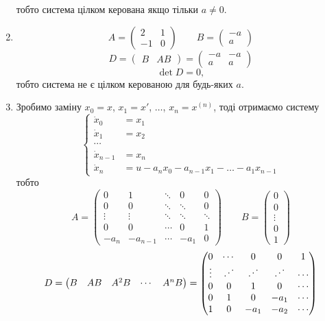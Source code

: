 \begin{solution}
\begin{enumerate}
        тобто система цілком керована якщо тільки $a \ne 0$.
        \item \[ A = \begin{pmatrix} 2 & 1 \\ -1 & 0 \end{pmatrix} \qquad B = \begin{pmatrix} -a \\ a \end{pmatrix} \]
        \[ D = \begin{pmatrix} B & AB \end{pmatrix} = \begin{pmatrix} -a & -a \\ a & a \end{pmatrix} \]
        \[ \det D = 0, \]
        тобто система не є цілком керованою для будь-яких $a$.
        \item Зробимо заміну $x_0 = x$, $x_1 = x'$, $\ldots$, $x_n = x^{(n)}$, тоді отримаємо систему
        \[ \left\{ \begin{aligned} \dot x_0 &= x_1 \\ \dot x_1 &= x_2 \\ \cdots \\ \dot x_{n-1} &= x_n \\ \dot x_n &= u - a_n x_0 - a_{n-1} x_1 - \ldots - a_1 x_{n-1} \end{aligned} \right. \]
        тобто
        \[ A = \begin{pmatrix} 0 & 1 & \ddots & 0 & 0 \\ 0 & 0 & \ddots & \ddots & 0 \\ \vdots & \vdots & \ddots & \ddots & \ddots \\ 0 & 0 & \cdots & 0 & 1 \\ -a_n & -a_{n-1} & \cdots & -a_1 & 0 \end{pmatrix} \qquad B = \begin{pmatrix} 0 \\ 0 \\ \vdots \\ 0 \\ 1 \end{pmatrix} \]
        \[ D = \begin{pmatrix} B & AB & A^2B & \cdots & A^nB \end{pmatrix} = \begin{pmatrix} 0 & \cdots & 0 & 0 & 1 \\ \vdots & \reflectbox{$\ddots$} & \reflectbox{$\ddots$} & \reflectbox{$\ddots$} & \cdots \\ 0 & 0 & 1 & 0 & \cdots \\ 0 & 1 & 0 & -a_1 & \cdots \\ 1 & 0 & -a_1 & -a_2 & \cdots \end{pmatrix} \]

\end{enumerate}
\end{solution}
